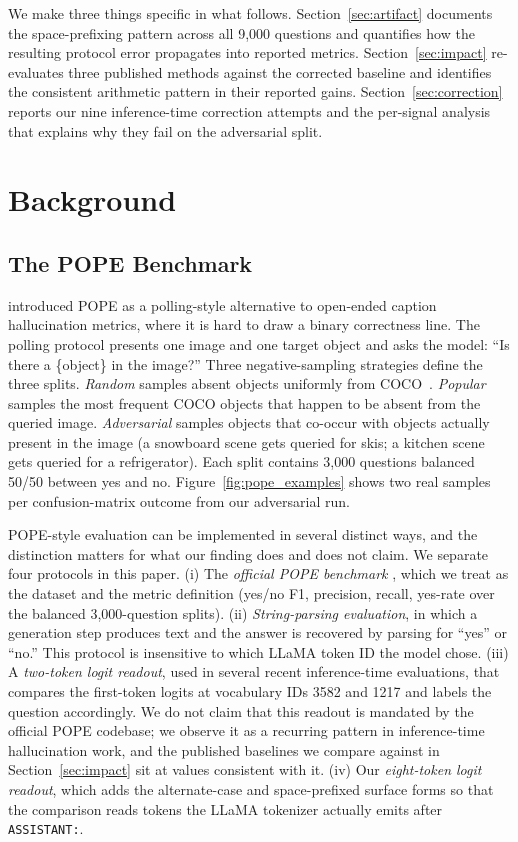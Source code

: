 \documentclass[11pt,letterpaper]{article}
\begin{document}
We make three things specific in what follows. Section~\ref{sec:artifact}
documents the space-prefixing pattern across all 9{,}000 questions and
quantifies how the resulting protocol error propagates into reported
metrics. Section~\ref{sec:impact} re-evaluates three published methods
against the corrected baseline and identifies the consistent arithmetic
pattern in their reported gains. Section~\ref{sec:correction} reports our
nine inference-time correction attempts and the per-signal analysis that
explains why they fail on the adversarial split.

\section{Background}
\label{sec:background}

\subsection{The POPE Benchmark}

\citet{li2023evaluating} introduced POPE as a polling-style alternative
to open-ended caption hallucination metrics, where it is hard to draw a
binary correctness line. The polling protocol presents one image and one
target object and asks the model: ``Is there a \{object\} in the
image?'' Three negative-sampling strategies define the three splits.
\emph{Random} samples absent objects uniformly from
COCO~\citep{lin2014microsoft}. \emph{Popular} samples the most frequent
COCO objects that happen to be absent from the queried image.
\emph{Adversarial} samples objects that co-occur with objects actually
present in the image (a snowboard scene gets queried for skis; a kitchen
scene gets queried for a refrigerator). Each split contains 3{,}000
questions balanced 50/50 between yes and no. Figure~\ref{fig:pope_examples}
shows two real samples per confusion-matrix outcome from our adversarial
run.

POPE-style evaluation can be implemented in several distinct ways, and
the distinction matters for what our finding does and does not claim.
We separate four protocols in this paper. (i) The \emph{official POPE
benchmark} \citep{li2023evaluating}, which we treat as the dataset and
the metric definition (yes/no F1, precision, recall, yes-rate over the
balanced 3{,}000-question splits). (ii) \emph{String-parsing
evaluation}, in which a generation step produces text and the answer
is recovered by parsing for ``yes'' or ``no.'' This protocol is
insensitive to which LLaMA token ID the model chose. (iii) A
\emph{two-token logit readout}, used in several recent inference-time
evaluations, that compares the first-token logits at vocabulary IDs
3582 and 1217 and labels the question accordingly. We do not claim
that this readout is mandated by the official POPE codebase; we
observe it as a recurring pattern in inference-time hallucination
work, and the published baselines we compare against in
Section~\ref{sec:impact} sit at values consistent with it. (iv) Our
\emph{eight-token logit readout}, which adds the alternate-case and
space-prefixed surface forms so that the comparison reads tokens the
LLaMA tokenizer actually emits after \texttt{ASSISTANT:}.
\end{document}
